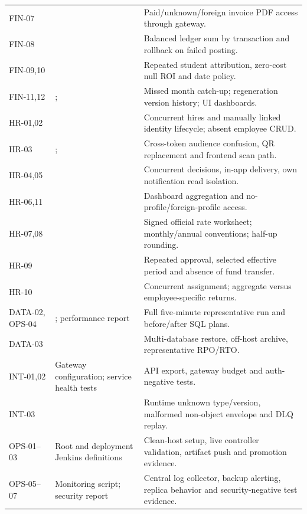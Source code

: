 \documentclass[10pt,a4paper]{article}
\begin{document}
\begin{longtable}{@{}L{31mm}L{60mm}L{69mm}@{}}
FIN-07 &  & Paid/unknown/foreign invoice PDF access through gateway.\\
FIN-08 &  & Balanced ledger sum by transaction and rollback on failed posting.\\
FIN-09,10 &  & Repeated student attribution, zero-cost null ROI and date policy.\\
FIN-11,12 & ;  & Missed month catch-up; regeneration version history; UI dashboards.\\
HR-01,02 &  & Concurrent hires and manually linked identity lifecycle; absent employee CRUD.\\
HR-03 & ;  & Cross-token audience confusion, QR replacement and frontend scan path.\\
HR-04,05 &  & Concurrent decisions, in-app delivery, own notification read isolation.\\
HR-06,11 &  & Dashboard aggregation and no-profile/foreign-profile access.\\
HR-07,08 &  & Signed official rate worksheet; monthly/annual conventions; half-up rounding.\\
HR-09 &  & Repeated approval, selected effective period and absence of fund transfer.\\
HR-10 &  & Concurrent assignment; aggregate versus employee-specific returns.\\
DATA-02, OPS-04 & ; performance report & Full five-minute representative run and before/after SQL plans.\\
DATA-03 &  & Multi-database restore, off-host archive, representative RPO/RTO.\\
INT-01,02 & Gateway configuration; service health tests & API export, gateway budget and auth-negative tests.\\
INT-03 &  & Runtime unknown type/version, malformed non-object envelope and DLQ replay.\\
OPS-01--03 & Root and deployment Jenkins definitions & Clean-host setup, live controller validation, artifact push and promotion evidence.\\
OPS-05--07 & Monitoring script; security report & Central log collector, backup alerting, replica behavior and security-negative test evidence.\\

\end{longtable}
\end{document}

